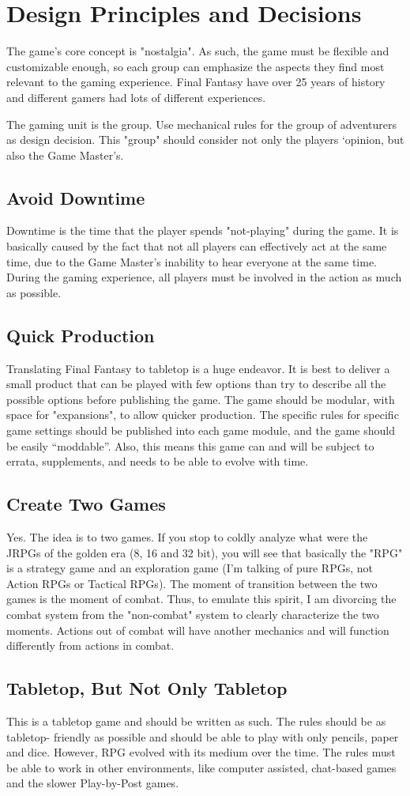 \section{Design Principles and Decisions}
The game's core concept is "nostalgia". As
such, the game must be flexible and customizable
enough, so each group can emphasize the aspects
they find most relevant to the gaming experience.
Final Fantasy have over 25 years of history and
different gamers had lots of different experiences.

The gaming unit is the group. Use
mechanical rules for the group of adventurers as
design decision. This "group" should consider not
only the players ‘opinion, but also the Game
Master's.
\subsection{Avoid Downtime}
Downtime is the time that the player spends
"not-playing" during the game. It is basically
caused by the fact that not all players can
effectively act at the same time, due to the Game
Master’s inability to hear everyone at the same
time. During the gaming experience, all players
must be involved in the action as much as possible.
\subsection{Quick Production}
Translating Final Fantasy to tabletop is a
huge endeavor. It is best to deliver a small product
that can be played with few options than try to
describe all the possible options before publishing
the game. The game should be modular, with space
for "expansions", to allow quicker production. The
specific rules for specific game settings should be
published into each game module, and the game
should be easily “moddable”. Also, this means this
game can and will be subject to errata,
supplements, and needs to be able to evolve with
time.
\subsection{Create Two Games}
Yes. The idea is to two games. If you stop to
coldly analyze what were the JRPGs of the golden
era (8, 16 and 32 bit), you will see that basically
the "RPG" is a strategy game and an exploration
game (I'm talking of pure RPGs, not Action RPGs or
Tactical RPGs). The moment of transition between
the two games is the moment of combat. Thus, to
emulate this spirit, I am divorcing the combat
system from the "non-combat" system to clearly
characterize the two moments. Actions out of
combat will have another mechanics and will
function differently from actions in combat.
\subsection{Tabletop, But Not Only Tabletop}
This is a tabletop game and should be
written as such. The rules should be as tabletop-
friendly as possible and should be able to play with
only pencils, paper and dice. However, RPG
evolved with its medium over the time. The rules
must be able to work in other environments, like
computer assisted, chat-based games and the
slower Play-by-Post games.